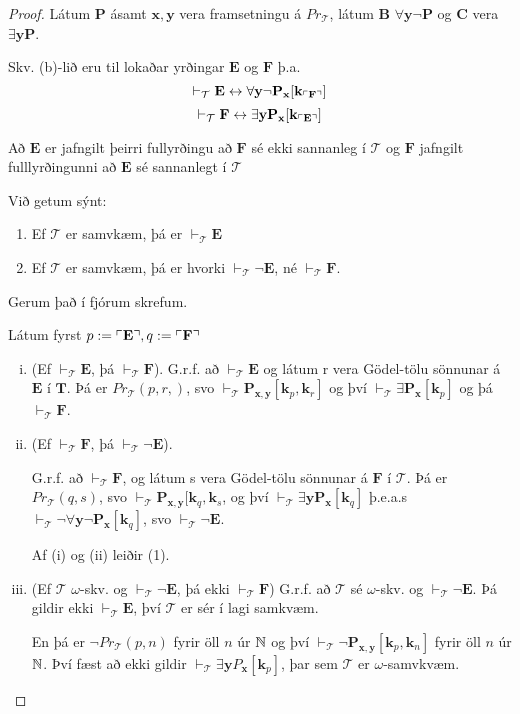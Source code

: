 \documentclass[12pt]{book}
\newcommand{\cT}{\mathcal{T}}
\newcommand{\bB}{\mathbf{B}}
\newcommand{\bC}{\mathbf{C}}
\newcommand{\vT}{\vdash_{\cT}}
\newcommand{\bE}{\mathbf{E}}
\newcommand{\bF}{\mathbf{F}}
\newcommand{\bP}{\mathbf{P}}
\newcommand{\bT}{\mathbf{T}}
\newcommand{\bx}{\mathbf{x}}
\newcommand{\bk}{\mathbf{k}}
\newcommand{\by}{\mathbf{y}}
\DeclarePairedDelimiter{\god}{\ulcorner}{\urcorner}
\begin{document}
\begin{proof}
Látum $\bP$  ásamt $\bx,\by$ vera framsetningu á $Pr_{\cT}$,
látum $\bB$ $\forall \by \lnot \bP$ og $\bC$ vera $\exists \by \bP$.

Skv. (b)-lið eru til lokaðar yrðingar $\bE$ og $\bF$ þ.a.
\[ \vT \bE \leftrightarrow \forall \by \lnot \bP_{\bx}[\bk_{\god{\bF}}]\]
\[ \vT \bF \leftrightarrow \exists \by \bP_{\bx}[\bk_{\god{\bE}}] \]

\begin{ath}
  Að $\bE$ er jafngilt þeirri fullyrðingu að $\bF$ sé ekki sannanleg
  í $\cT$ og $\bF$ jafngilt fulllyrðingunni að $\bE$ sé sannanlegt í $\cT$
  
\end{ath}


Við getum sýnt:

\begin{enumerate}[(1)]
\item  Ef $\cT$ er samvkæm, þá er $\vT \bE$
\item  Ef $\cT$ er samvkæm, þá er hvorki $\vT \lnot \bE$, né $\vT \bF$.
\end{enumerate}

Gerum það í fjórum skrefum.

Látum fyrst 
$p := \god{\bE}, q := \god{\bF}$

\begin{enumerate}[(i)]
\item  (Ef $\vT \bE$, þá $\vT \bF$).
G.r.f. að $\vT \bE$ og látum r vera Gödel-tölu sönnunar á $\bE$ í $\bT$.
Þá er $Pr_{\cT}(p,r,)$, svo
$\vT \bP_{\bx,\by}[\bk_p, \bk_r]$ og því $\vT \exists \bP_{\bx}[\bk_p]$
og þá $\vT \bF$.

\item  (Ef $\vT \bF$, þá $\vT \lnot \bE$).

G.r.f. að $\vT \bF$, og látum s vera Gödel-tölu sönnunar á $\bF$ í
$\cT$. Þá er $Pr_{\cT}(q,s)$, svo $\vT \bP_{\bx,\by}[\bk_q,\bk_s$, og því
$\vT \exists \by \bP_{\bx}[\bk_q]$ þ.e.a.s
$\vT \lnot \forall \by \lnot \bP_{\bx} [\bk_q]$, svo $\vT \lnot \bE$.

Af (i) og (ii) leiðir (1).

\item (Ef $\cT$ $\omega$-skv. og $\vT \lnot \bE$, þá ekki $\vT  \bF$)
G.r.f. að $\cT$ sé $\omega$-skv. og $\vT \lnot \bE$.
Þá gildir ekki $\vT \bE$, því $\cT$ er sér í lagi samkvæm.

En þá er $\lnot Pr_{\cT}(p,n)$ fyrir öll $n$ úr $\mathbb{N}$ og því
$\vT \lnot \bP_{\bx,\by}[\bk_p,\bk_n]$ fyrir öll $n$ úr $\mathbb{N}$.
Því fæst að ekki gildir $\vT \exists \by P_{\bx}[\bk_p]$,
þar sem $\cT$ er $\omega$-samvkvæm.


\end{enumerate}
\end{proof}
\end{document}
